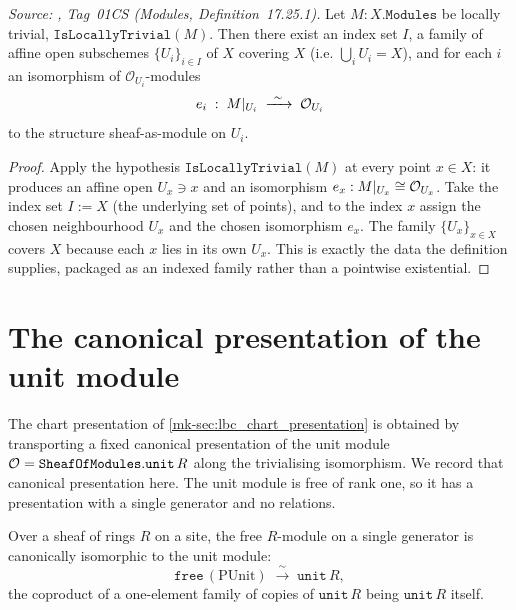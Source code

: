 \begin{lemma}\label{mk-lem:lbc_trivializing_cover}
  \leanok

  \textit{Source: \cite{stacks-project}, Tag~01CS (Modules, Definition~17.25.1).}
  Let \(M : X.\mathtt{Modules}\) be locally trivial, \(\texttt{IsLocallyTrivial}(M)\).
  Then there exist an index set \(I\), a family of affine open subschemes
  \(\{U_i\}_{i \in I}\) of \(X\) covering \(X\) (i.e. \(\bigcup_i U_i = X\)), and
  for each \(i\) an isomorphism of \(\mathcal{O}_{U_i}\)-modules
  \[
    e_i \;:\; M|_{U_i} \;\xrightarrow{\ \sim\ }\; \struct{U_i}
  \]
  to the structure sheaf-as-module on \(U_i\).
\end{lemma}

\begin{proof}
  \leanok
  Apply the hypothesis \(\texttt{IsLocallyTrivial}(M)\) at every point \(x \in X\): it
  produces an affine open \(U_x \ni x\) and an isomorphism
  \(e_x : M|_{U_x} \cong \mathcal{O}_{U_x}\). Take the index set \(I := X\) (the
  underlying set of points), and to the index \(x\) assign the chosen
  neighbourhood \(U_x\) and the chosen isomorphism \(e_x\). The family
  \(\{U_x\}_{x \in X}\) covers \(X\) because each \(x\) lies in its own \(U_x\).
  This is exactly the data the definition supplies, packaged as an indexed
  family rather than a pointwise existential.
\end{proof}

\section{The canonical presentation of the unit module}
\label{mk-sec:lbc_unit_presentation}

The chart presentation of \ref{mk-sec:lbc_chart_presentation} is obtained by
transporting a fixed canonical presentation of the unit module
\(\mathcal{O}_{} = \mathtt{SheafOfModules.unit}\,R\) along the trivialising
isomorphism. We record that canonical presentation here. The unit module is free
of rank one, so it has a presentation with a single generator and no relations.

\begin{definition}\label{mk-def:lbc_free_unit_iso}
  \leanok

  Over a sheaf of rings \(R\) on a site, the free \(R\)-module on a single
  generator is canonically isomorphic to the unit module:
  \[
    \mathtt{free}\,(\mathrm{PUnit}) \;\xrightarrow{\ \sim\ }\; \mathtt{unit}\,R,
  \]
  the coproduct of a one-element family of copies of \(\mathtt{unit}\,R\) being
  \(\mathtt{unit}\,R\) itself.
\end{definition}

